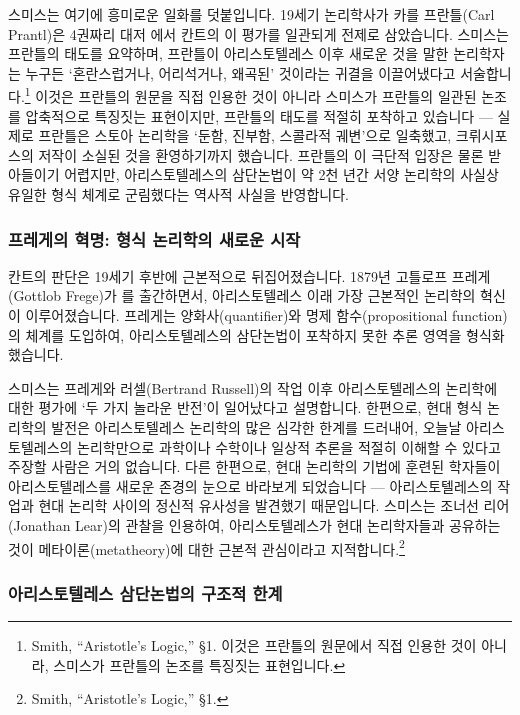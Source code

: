 \documentclass[12pt, a4paper]{article}
\begin{document}
스미스는 여기에 흥미로운 일화를 덧붙입니다. 19세기 논리학사가 카를 프란틀(Carl Prantl)은 4권짜리 대저 에서 칸트의 이 평가를 일관되게 전제로 삼았습니다. 스미스는 프란틀의 태도를 요약하며, 프란틀이 아리스토텔레스 이후 새로운 것을 말한 논리학자는 누구든 `혼란스럽거나, 어리석거나, 왜곡된' 것이라는 귀결을 이끌어냈다고 서술합니다.\footnote{Smith, ``Aristotle's Logic,'' §1. 이것은 프란틀의 원문에서 직접 인용한 것이 아니라, 스미스가 프란틀의 논조를 특징짓는 표현입니다.} 이것은 프란틀의 원문을 직접 인용한 것이 아니라 스미스가 프란틀의 일관된 논조를 압축적으로 특징짓는 표현이지만, 프란틀의 태도를 적절히 포착하고 있습니다 --- 실제로 프란틀은 스토아 논리학을 `둔함, 진부함, 스콜라적 궤변'으로 일축했고, 크뤼시포스의 저작이 소실된 것을 환영하기까지 했습니다. 프란틀의 이 극단적 입장은 물론 받아들이기 어렵지만, 아리스토텔레스의 삼단논법이 약 2천 년간 서양 논리학의 사실상 유일한 형식 체계로 군림했다는 역사적 사실을 반영합니다.

\subsubsection{프레게의 혁명: 형식 논리학의 새로운 시작}

칸트의 판단은 19세기 후반에 근본적으로 뒤집어졌습니다. 1879년 고틀로프 프레게(Gottlob Frege)가 를 출간하면서, 아리스토텔레스 이래 가장 근본적인 논리학의 혁신이 이루어졌습니다. 프레게는 양화사(quantifier)와 명제 함수(propositional function)의 체계를 도입하여, 아리스토텔레스의 삼단논법이 포착하지 못한 추론 영역을 형식화했습니다.

스미스는 프레게와 러셀(Bertrand Russell)의 작업 이후 아리스토텔레스의 논리학에 대한 평가에 `두 가지 놀라운 반전'이 일어났다고 설명합니다. 한편으로, 현대 형식 논리학의 발전은 아리스토텔레스 논리학의 많은 심각한 한계를 드러내어, 오늘날 아리스토텔레스의 논리학만으로 과학이나 수학이나 일상적 추론을 적절히 이해할 수 있다고 주장할 사람은 거의 없습니다. 다른 한편으로, 현대 논리학의 기법에 훈련된 학자들이 아리스토텔레스를 새로운 존경의 눈으로 바라보게 되었습니다 --- 아리스토텔레스의 작업과 현대 논리학 사이의 정신적 유사성을 발견했기 때문입니다. 스미스는 조너선 리어(Jonathan Lear)의 관찰을 인용하여, 아리스토텔레스가 현대 논리학자들과 공유하는 것이 메타이론(metatheory)에 대한 근본적 관심이라고 지적합니다.\footnote{Smith, ``Aristotle's Logic,'' §1.}

\subsubsection{아리스토텔레스 삼단논법의 구조적 한계}
\end{document}
